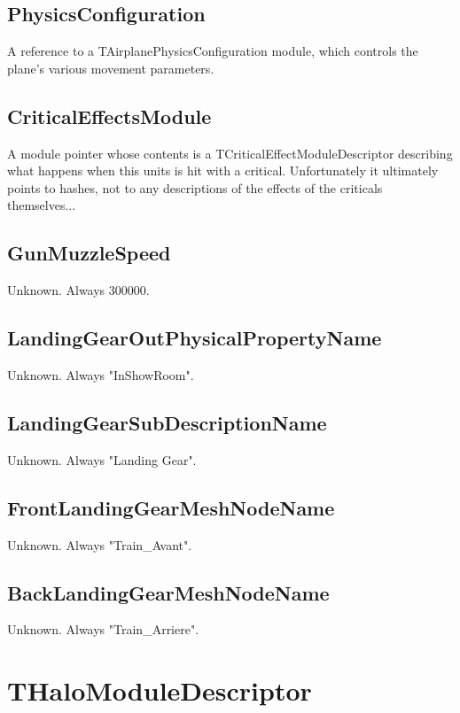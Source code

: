 \documentclass{article}
\begin{document}
\subsection{PhysicsConfiguration}

A reference to a TAirplanePhysicsConfiguration module, which controls the plane's various movement parameters.

\subsection{CriticalEffectsModule}

A module pointer whose contents is a TCriticalEffectModuleDescriptor describing what happens when this units is hit with a critical. Unfortunately it ultimately points to hashes, not to any descriptions of the effects of the criticals themselves...

\subsection{GunMuzzleSpeed}

Unknown. Always 300000.

\subsection{LandingGearOutPhysicalPropertyName}

Unknown. Always "InShowRoom".

\subsection{LandingGearSubDescriptionName}

Unknown. Always "Landing Gear".

\subsection{FrontLandingGearMeshNodeName}

Unknown. Always "Train\_Avant".

\subsection{BackLandingGearMeshNodeName}

Unknown. Always "Train\_Arriere".

\section{THaloModuleDescriptor}
\end{document}
